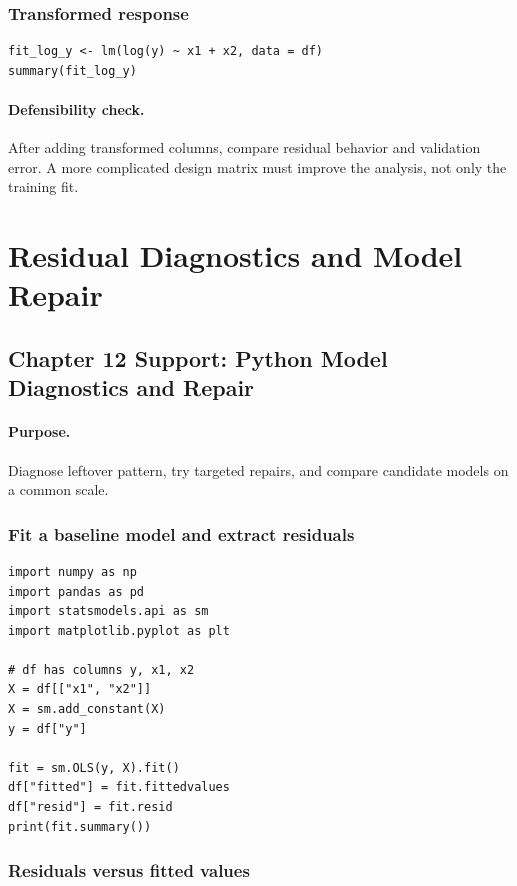 \subsubsection*{Transformed response}

\begin{verbatim}
fit_log_y <- lm(log(y) ~ x1 + x2, data = df)
summary(fit_log_y)
\end{verbatim}

\paragraph{Defensibility check.} After adding transformed columns, compare residual behavior and validation error.  A more complicated design matrix must improve the analysis, not only the training fit.

\section{Residual Diagnostics and Model Repair}
\label{app:cookbook-residual-diagnostics-repair}

\subsection{Chapter 12 Support: Python Model Diagnostics and Repair}
\label{app:ch12-software-cookbook-python}

\paragraph{Purpose.} Diagnose leftover pattern, try targeted repairs, and compare candidate models on a common scale.

\subsubsection*{Fit a baseline model and extract residuals}

\begin{verbatim}
import numpy as np
import pandas as pd
import statsmodels.api as sm
import matplotlib.pyplot as plt

# df has columns y, x1, x2
X = df[["x1", "x2"]]
X = sm.add_constant(X)
y = df["y"]

fit = sm.OLS(y, X).fit()
df["fitted"] = fit.fittedvalues
df["resid"] = fit.resid
print(fit.summary())
\end{verbatim}

\subsubsection*{Residuals versus fitted values}

